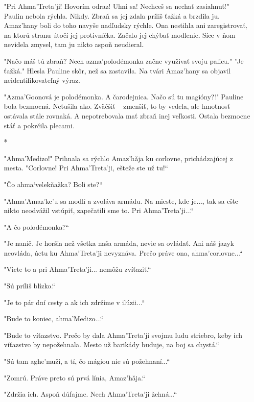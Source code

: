 \documentclass{book}
\begin{document}
"$ $Pri Ahma'Treta'ji! Hovorím odraz! Uhni sa! Nechceš sa nechať zasiahnuť!"$ $ Paulin nebola rýchla. Nikdy. Zbraň sa jej zdala príliš ťažká a brzdila ju. Amaz'hany boli do toho navyše nadľudsky rýchle. Ona nestihla ani zaregistrovať, na ktorú stranu útočí jej protivníčka. Začalo jej chýbať modlenie. Síce v ňom nevidela zmysel, tam ju nikto aspoň neudieral.

"$ $Načo máš tú zbraň? Nech azma'polodémonka začne využívať svoju palicu."$ $ "$ $Je ťažká."$ $ Hlesla Pauline skôr, než sa zastavila. Na tvári Amaz'hany sa objavil neidentifikovateľný výraz.

"$ $Azma'Goonová je polodémonka. A čarodejnica. Načo sú tu magióny?!"$ $ Pauline bola bezmocná. Netušila ako. Zväčšiť – zmenšiť, to by vedela, ale hmotnosť ostávala stále rovnaká. A nepotrebovala mať zbraň inej veľkosti. Ostala bezmocne stáť a pokrčila plecami.

\begin{center}
*
\end{center}

"$ $Ahma'Medizo!"$ $ Prihnala sa rýchlo Amaz'ha\v{}ja ku corlovne, prichádzajúcej z mesta. "$ $Corlovne! Pri Ahma'Treta'ji, ešteže ste už tu!“

"$ $Čo ahma‘velekňažka? Boli ste?“

"$ $Ahma'Amaz'ke'u sa modlí a zvoláva armádu. Na mieste, kde je..., tak sa ešte nikto neodvážil vstúpiť, zapečatili sme to. Pri Ahma'Treta'ji...“

"$ $A čo polodémonka?“

"$ $Je nanič. Je horšia než všetka naša armáda, nevie sa ovládať. Ani náš jazyk neovláda, úctu ku Ahma'Treta'ji nevyznáva. Prečo práve ona, ahma'corlovne...“

"$ $Viete to a pri Ahma'Treta'ji... nemôžu zvíťaziť.“

"$ $Sú príliš blízko.“

"$ $Je to pár dní cesty a ak ich zdržíme v ilúzii...“

"$ $Bude to koniec, ahma'Medizo...“

"$ $Bude to víťazstvo. Prečo by dala Ahma'Treta'ji svojmu ľudu striebro, keby ich víťazstvo by nepožehnala. Mesto už barikády buduje, na boj sa chystá.“

"$ $Sú tam aghe'muži, a tí, čo mágiou nie sú požehnaní...“

"$ $Zomrú. Práve preto sú prvá línia, Amaz'ha\v{}ja.“

"$ $Zdržia ich. Aspoň dúfajme. Nech Ahma'Treta'ji žehná...“
\end{document}

